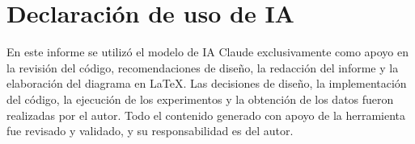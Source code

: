 \documentclass[11pt,letterpaper]{article}
\begin{document}
\section*{Declaración de uso de IA}

En este informe se utilizó el modelo de IA Claude exclusivamente como apoyo en la
revisión del código, recomendaciones de diseño, la redacción del informe y la
elaboración del diagrama en \LaTeX{}. Las decisiones de
diseño, la implementación del código, la ejecución de los experimentos y la obtención de
los datos fueron realizadas por el autor. Todo el contenido generado con apoyo de la
herramienta fue revisado y validado, y su responsabilidad es del autor.
\end{document}
